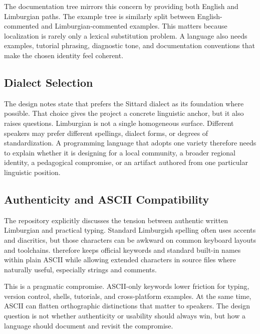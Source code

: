 The documentation tree mirrors this concern by providing both English and
Limburgian paths. The example tree is similarly split between English-commented
and Limburgian-commented examples. This matters because localization is rarely
only a lexical substitution problem. A language also needs examples, tutorial
phrasing, diagnostic tone, and documentation conventions that make the chosen
identity feel coherent.

\subsection{Dialect Selection}

The design notes state that \plat{} prefers the Sittard dialect as its
foundation where possible. That choice gives the project a concrete linguistic
anchor, but it also raises questions. Limburgian is not a single homogeneous
surface. Different speakers may prefer different spellings, dialect forms, or
degrees of standardization. A programming language that adopts one variety
therefore needs to explain whether it is designing for a local community, a
broader regional identity, a pedagogical compromise, or an artifact authored
from one particular linguistic position.


\subsection{Authenticity and ASCII Compatibility}

The repository explicitly discusses the tension between authentic written
Limburgian and practical typing. Standard Limburgish spelling often uses
accents and diacritics, but those characters can be awkward on common keyboard
layouts and toolchains. \plat{} therefore keeps official keywords and standard
built-in names within plain ASCII while allowing extended characters in source
files where naturally useful, especially strings and comments.

This is a pragmatic compromise. ASCII-only keywords lower friction for typing,
version control, shells, tutorials, and cross-platform examples. At the same
time, ASCII can flatten orthographic distinctions that matter to speakers.
The design question is not whether authenticity or usability should always
win, but how a language should document and revisit the compromise.

